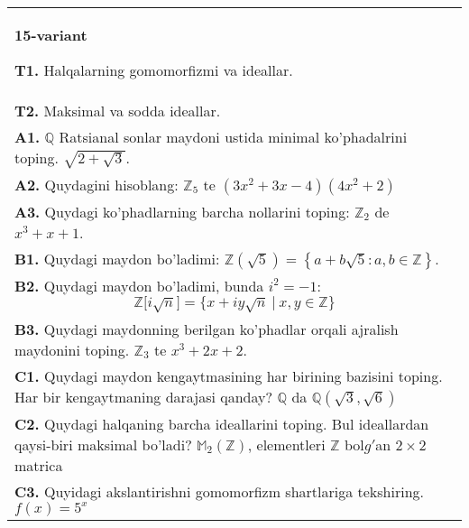 \documentclass{article}
\begin{document}
\begin{tabular}{m{17cm}}
\textbf{15-variant}
\newline

\textbf{T1.} Halqalarning gomomorfizmi va ideallar. \\
\textbf{T2.} Maksimal va sodda ideallar. \\
\textbf{A1.} \(\mathbb{Q}\) Ratsianal sonlar maydoni ustida minimal ko'phadalrini toping.
\(\sqrt{2 + \sqrt{3}}\). \\
\textbf{A2.} Quydagini hisoblang:
\(\mathbb{Z}_{5}\) te \(\left( 3x^{2} + 3x - 4 \right)\left( 4x^{2} + 2 \right)\) \\
\textbf{A3.} Quydagi ko'phadlarning barcha nollarini toping:
\(\mathbb{Z}_{2}\) de \(x^{3} + x + 1\). \\
\textbf{B1.} Quydagi maydon bo'ladimi:
\(\mathbb{Z}\left( \sqrt{5} \right) = \left\{ a + b\sqrt{5}:a,b \in \mathbb{Z} \right\}\). \\
\textbf{B2.} Quydagi maydon bo'ladimi, bunda \(i^{2} = - 1\):
\[\mathbb{Z\lbrack}i\sqrt{n}\rbrack = \{ x + iy\sqrt{n}\ |\ x,y \in \mathbb{Z\}}\] \\
\textbf{B3.} Quydagi maydonning berilgan ko'phadlar orqali ajralish maydonini toping.
\(\mathbb{Z}_{3}\) te \(x^{3} + 2x + 2\). \\
\textbf{C1.} Quydagi maydon kengaytmasining har birining bazisini toping. Har bir kengaytmaning darajasi qanday?
\(\mathbb{Q}\) da \(\mathbb{Q}\left( \sqrt{3},\sqrt{6} \right)\) \\
\textbf{C2.} Quydagi halqaning barcha ideallarini toping. Bul ideallardan qaysi-biri maksimal bo'ladi?
\(\mathbb{M}_{2}\left( \mathbb{Z} \right)\), elementleri \(\mathbb{Z}\) bol\(g'\)an \(2 \times 2\) matrica \\
\textbf{C3.} Quyidagi akslantirishni gomomorfizm shartlariga tekshiring. \(f(x) = 5^{x}\) \\

\end{tabular}
\vspace{1cm}
\end{document}
